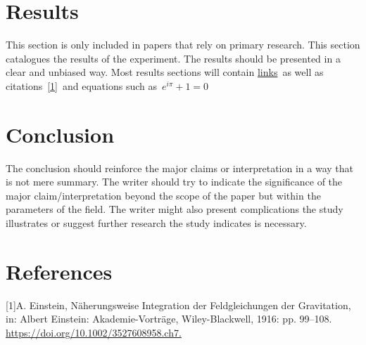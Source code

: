 \documentclass{article}
\begin{document}
\section*{Results}\label{results}

This section is only included in papers that rely on primary research.
This section catalogues the results of the experiment. The results
should be presented in a clear and unbiased way. Most results sections
will contain \href{http://authorea.com}{links}~as well as
citations~\hyperref[csl:1]{[1]}~and equations such as~\(e^{i\pi}+1=0\)\\

\section*{Conclusion}\label{auto-label-section-853974}

The conclusion should reinforce the major claims or interpretation in a
way that is not mere summary. The writer should try to indicate the
significance of the major claim/interpretation beyond the scope of the
paper but within the parameters of the field. The writer might also
present complications the study illustrates or suggest further research
the study indicates is necessary.

\FloatBarrier
\section*{References}\sloppy
{}
\label{csl:1}[1]A. Einstein, {Näherungsweise Integration der Feldgleichungen der Gravitation}, in: Albert Einstein: Akademie-Vorträge, Wiley-Blackwell, 1916: pp. 99–108. \url{https://doi.org/10.1002/3527608958.ch7.}
\end{document}
